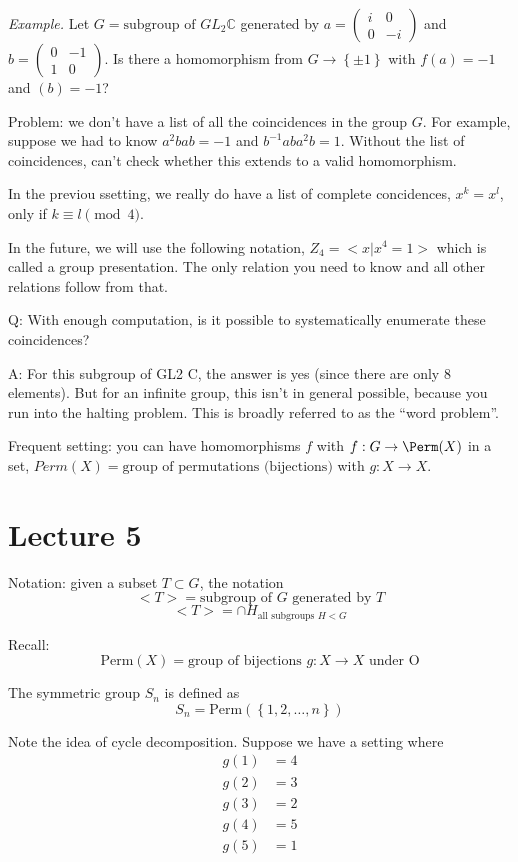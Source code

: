 \documentclass[12pt]{article}
\newcommand*{\mat}[1]{\begin{pmatrix}#1\end{pmatrix}}
\def\CC{\mathbb{C}}
\newcommand*{\mat}[1]{\begin{pmatrix}#1\end{pmatrix}}
\begin{document}
{\it Example.} Let $G = \text{subgroup of } GL_2 \CC$ generated by $a = \mat{i & 0 \\ 0 & -i}$ and $b = \mat{0 & -1 \\ 1 & 0}$.  Is there a homomorphism from $G \to \left\{ \pm 1 \right\}$ with $f(a) = -1$ and $(b) = -1$?

Problem: we don't have a list of all the coincidences in the group $G$.  For example, suppose we had to know $a^2 bab = -1$ and $b^{-1} ab a^2b = 1$.  Without the list of coincidences, can't check whether this extends to a valid homomorphism.

In the previou ssetting, we really do have a list of complete concidences, $x^k = x^l$, only if $k \equiv l \pmod{4}$.

In the future, we will use the following notation, $Z_4 = < x | x^4 = 1>$ which is called a group presentation.  The only relation you need to know and all other relations follow from that.

Q: With enough computation, is it possible to systematically enumerate these coincidences?  

A: For this subgroup of GL2 C, the answer is yes (since there are only 8 elements).  But for an infinite group, this isn't in general possible, because you run into the halting problem.  This is broadly referred to as the ``word problem''.

Frequent setting: you can have homomorphisms $f$ with $f: G \to \Perm(X)$ in a set, $Perm(X) = \text{group of permutations (bijections)}$ with $g: X \to X$.

\section{Lecture 5}

Notation: given a subset $T \subset G$, the notation
\[
  <T> = \text{subgroup of $G$ generated by $T$}
\]
\[
  <T> = \cap H_{\text{all subgroups $H < G$}}
\]

Recall:
\[
  \text{Perm}(X) = \text{group of bijections $g: X \to X$ under O} 
\]

The symmetric group $S_n$ is defined as
\[
  S_n = \text{Perm}(\left\{ 1, 2, \dots, n \right\})
\]

Note the idea of cycle decomposition.  Suppose we have a setting where
\begin{align*}
  g(1) &= 4 \\
  g(2) &= 3 \\
  g(3) &= 2 \\
  g(4) &= 5 \\
  g(5) &= 1
\end{align*}
\end{document}
